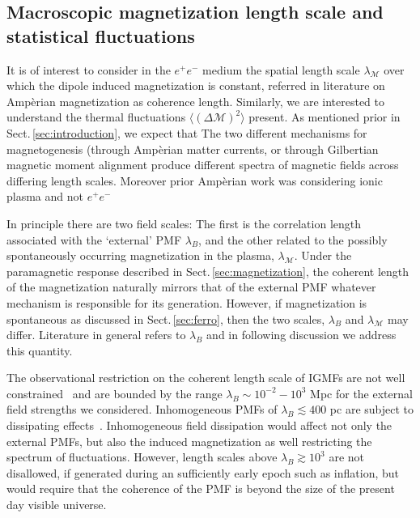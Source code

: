 \documentclass[aps,prd,floatfix,reprint]{revtex4-2}
\newcommand{\rsec}[1]{Sect.\,{\ref{#1}}}
\newcommand*{\xblue}{\color{blue}}
\begin{document}
{\xblue
\subsection{Macroscopic magnetization length scale and statistical fluctuations}
\label{sec:lengthscale}
\noindent It is of interest to consider in the $e^{+}e^{-}$ medium the spatial length scale $\lambda_\mathcal{M}$ over which the dipole induced magnetization is constant, referred in literature on Amp{\`e}rian magnetization as coherence length. Similarly, we are interested to understand the thermal fluctuations $\langle(\Delta\mathcal{M})^{2}\rangle$ present. As mentioned prior in \rsec{sec:introduction}, we expect that
The two different mechanisms for magnetogenesis (through Amp{\`e}rian matter currents, or through Gilbertian magnetic moment alignment  produce different spectra of magnetic fields across differing length scales. Moreover prior Amp{\`e}rian work was considering ionic plasma and not $e^{+}e^{-}$ 

In principle there are two field scales: The first is the correlation length~\cite{Kahniashvili:2012uj} associated with the `external' PMF $\lambda_{B}$, and the other related to the possibly spontaneously occurring magnetization in the plasma, $\lambda_\mathcal{M}$. Under the paramagnetic response described in \rsec{sec:magnetization}, the coherent length of the magnetization naturally mirrors that of the external PMF whatever mechanism is responsible for its generation. However, if magnetization is spontaneous as discussed in \rsec{sec:ferro}, then the two scales, $\lambda_{B}$ and $\lambda_\mathcal{M}$ may differ. Literature in general refers to $\lambda_{B}$ and in following discussion we address this quantity.

The observational restriction on the coherent length scale of IGMFs are not well constrained~\cite{Giovannini:2022rrl,Durrer:2013pga,AlvesBatista:2021sln} and are bounded by the range  $\lambda_{B}\sim10^{-2}-10^{3}$ Mpc for the external field strengths we considered. Inhomogeneous PMFs of $\lambda_{B}\lesssim400$ pc are subject to dissipating effects~\cite{Jedamzik:1999bm}. Inhomogeneous field dissipation would affect not only the external PMFs, but also the induced magnetization as well restricting the spectrum of fluctuations. However, length scales above $\lambda_{B}\gtrsim10^{3}$ are not disallowed, if generated during an sufficiently early epoch such as inflation, but would require that the coherence of the PMF is beyond the size of the present day visible universe.

}
\end{document}
